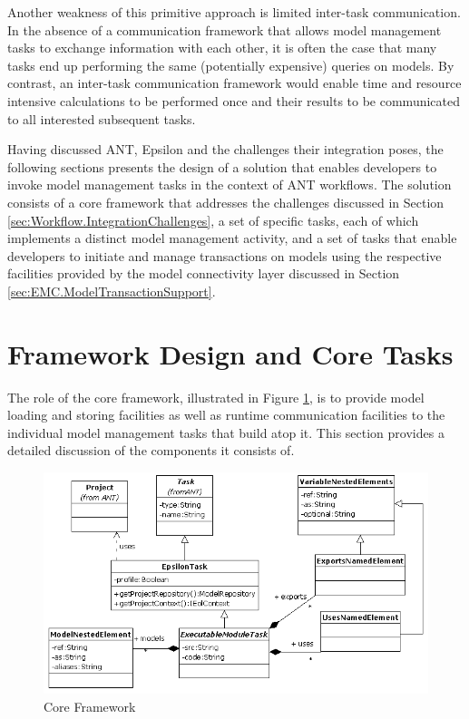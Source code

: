 Another weakness of this primitive approach is limited inter-task communication. In the absence of a communication framework that allows model management tasks to exchange information with each other, it is often the case that many tasks end up performing the same (potentially expensive) queries on models. By contrast, an inter-task communication framework would enable time and resource intensive calculations to be performed once and their results to be communicated to all interested subsequent tasks.

Having discussed ANT, Epsilon and the challenges their integration poses, the following sections presents the design of a solution that enables developers to invoke model management tasks in the context of ANT workflows. The solution consists of a core framework that addresses the challenges discussed in Section \ref{sec:Workflow.IntegrationChallenges}, a set of specific tasks, each of which implements a distinct model management activity, and a set of tasks that enable developers to initiate and manage transactions on models using the respective facilities provided by the model connectivity layer discussed in Section \ref{sec:EMC.ModelTransactionSupport}. 

\section{Framework Design and Core Tasks}
\label{sec:Workflow.Framework}

The role of the core framework, illustrated in Figure \ref{fig:Core}, is to provide model loading and storing facilities as well as runtime communication facilities to the individual model management tasks that build atop it. This section provides a detailed discussion of the components it consists of.

\begin{figure}
	\centering
		\includegraphics{images/AntEpsilon.png}
	\caption{Core Framework}
	\label{fig:Core}
\end{figure}

